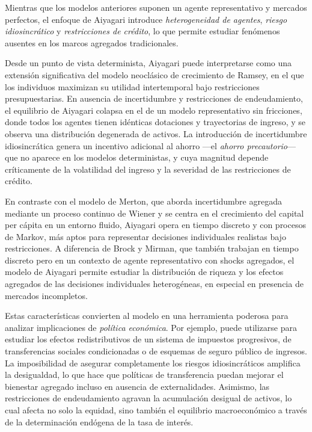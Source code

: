 \documentclass[a4paper,12pt]{article}
\begin{document}
Mientras que los modelos anteriores suponen un agente representativo y mercados perfectos, el enfoque de Aiyagari introduce \textit{heterogeneidad de agentes}, \textit{riesgo idiosincrático} y \textit{restricciones de crédito}, lo que permite estudiar fenómenos ausentes en los marcos agregados tradicionales.

Desde un punto de vista determinista, Aiyagari puede interpretarse como una extensión significativa del modelo neoclásico de crecimiento de Ramsey, en el que los individuos maximizan su utilidad intertemporal bajo restricciones presupuestarias. En ausencia de incertidumbre y restricciones de endeudamiento, el equilibrio de Aiyagari colapsa en el de un modelo representativo sin fricciones, donde todos los agentes tienen idénticas dotaciones y trayectorias de ingreso, y se observa una distribución degenerada de activos. La introducción de incertidumbre idiosincrática genera un incentivo adicional al ahorro —el \textit{ahorro precautorio}— que no aparece en los modelos deterministas, y cuya magnitud depende críticamente de la volatilidad del ingreso y la severidad de las restricciones de crédito.

En contraste con el modelo de Merton, que aborda incertidumbre agregada mediante un proceso continuo de Wiener y se centra en el crecimiento del capital per cápita en un entorno fluido, Aiyagari opera en tiempo discreto y con procesos de Markov, más aptos para representar decisiones individuales realistas bajo restricciones. A diferencia de Brock y Mirman, que también trabajan en tiempo discreto pero en un contexto de agente representativo con shocks agregados, el modelo de Aiyagari permite estudiar la distribución de riqueza y los efectos agregados de las decisiones individuales heterogéneas, en especial en presencia de mercados incompletos.

Estas características convierten al modelo en una herramienta poderosa para analizar implicaciones de \textit{política económica}. Por ejemplo, puede utilizarse para estudiar los efectos redistributivos de un sistema de impuestos progresivos, de transferencias sociales condicionadas o de esquemas de seguro público de ingresos. La imposibilidad de asegurar completamente los riesgos idiosincráticos amplifica la desigualdad, lo que hace que políticas de transferencia puedan mejorar el bienestar agregado incluso en ausencia de externalidades. Asimismo, las restricciones de endeudamiento agravan la acumulación desigual de activos, lo cual afecta no solo la equidad, sino también el equilibrio macroeconómico a través de la determinación endógena de la tasa de interés.
\end{document}
